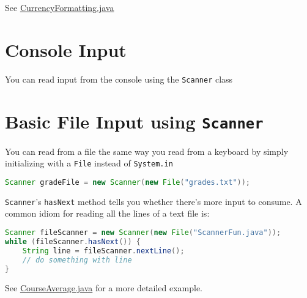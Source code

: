 \documentclass{article}
\begin{document}
See \href{../CurrencyFormatting.java}{CurrencyFormatting.java}

\newpage

\section{Console Input}


You can read input from the console using the {\tt Scanner} class

\section{Basic File Input using {\tt Scanner}}


You can read from a file the same way you read from a keyboard by simply initializing with a {\tt File} instead of {\tt System.in}
\begin{lstlisting}[language=Java]
Scanner gradeFile = new Scanner(new File("grades.txt"));
\end{lstlisting}
{\tt Scanner}'s {\tt hasNext} method tells you whether there's more input to consume.  A common idiom for reading all the lines of a text file is:
\begin{lstlisting}[language=Java]
Scanner fileScanner = new Scanner(new File("ScannerFun.java"));
while (fileScanner.hasNext()) {
    String line = fileScanner.nextLine();
    // do something with line
}

\end{lstlisting}

See \href{../code/CourseAverage.java}{CourseAverage.java} for a more detailed example.
\end{document}
